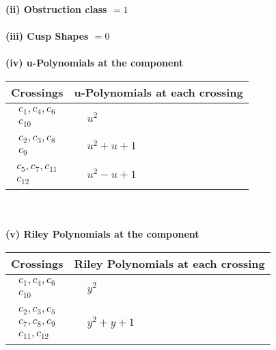 \documentclass[1p]{elsarticle_modified}
\theoremstyle{definition}
\begin{document}
\flushleft \textbf{(ii) Obstruction class $= 1$}\\~\\
\flushleft \textbf{(iii) Cusp Shapes $= 0$}\\~\\
\newpage\renewcommand{\arraystretch}{1}
\flushleft \textbf{(iv) u-Polynomials at the component}\newline \\
\begin{tabular}{m{50pt}|m{274pt}}
Crossings & \hspace{64pt}u-Polynomials at each crossing \\
\hline $$\begin{aligned}c_{1},c_{4},c_{6}\\c_{10}\end{aligned}$$&$\begin{aligned}
&u^2
\end{aligned}$\\
\hline $$\begin{aligned}c_{2},c_{3},c_{8}\\c_{9}\end{aligned}$$&$\begin{aligned}
&u^2+u+1
\end{aligned}$\\
\hline $$\begin{aligned}c_{5},c_{7},c_{11}\\c_{12}\end{aligned}$$&$\begin{aligned}
&u^2- u+1
\end{aligned}$\\
\hline
\end{tabular}\\~\\
\newpage\renewcommand{\arraystretch}{1}
\flushleft \textbf{(v) Riley Polynomials at the component}\newline \\
\begin{tabular}{m{50pt}|m{274pt}}
Crossings & \hspace{64pt}Riley Polynomials at each crossing \\
\hline $$\begin{aligned}c_{1},c_{4},c_{6}\\c_{10}\end{aligned}$$&$\begin{aligned}
&y^2
\end{aligned}$\\
\hline $$\begin{aligned}c_{2},c_{3},c_{5}\\c_{7},c_{8},c_{9}\\c_{11},c_{12}\end{aligned}$$&$\begin{aligned}
&y^2+y+1
\end{aligned}$\\
\hline
\end{tabular}\\~\\
\end{document}
